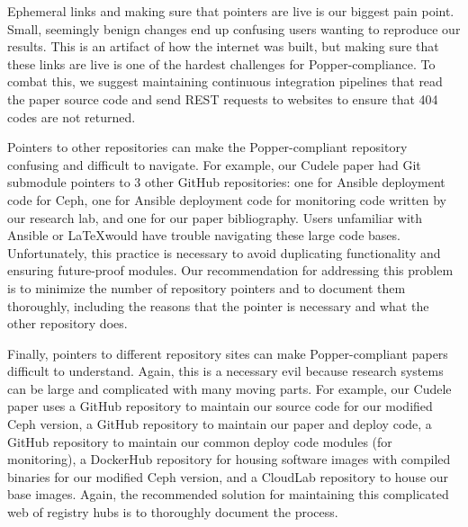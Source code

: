 Ephemeral links and making sure that pointers are live is our biggest pain
point. Small, seemingly benign changes end up confusing users wanting to
reproduce our results. This is an artifact of how the internet was built, but
making sure that these links are live is one of the hardest challenges for
Popper-compliance. To combat this, we suggest maintaining continuous
integration pipelines that read the paper source code and send REST requests to
websites to ensure that 404 codes are not returned.

Pointers to other repositories can make the Popper-compliant repository
confusing and difficult to navigate. For example, our Cudele paper had Git
submodule pointers to 3 other GitHub repositories: one for Ansible deployment
code for Ceph, one for Ansible deployment code for monitoring code written by
our research lab, and one for our paper bibliography. Users unfamiliar with
Ansible or \LaTeX would have trouble navigating these large code bases.
Unfortunately, this practice is necessary to avoid duplicating functionality
and ensuring future-proof modules. Our recommendation for addressing this
problem is to minimize the number of repository pointers and to document them
thoroughly, including the reasons that the pointer is necessary and what the
other repository does.

Finally, pointers to different repository sites can make Popper-compliant
papers difficult to understand. Again, this is a necessary evil because
research systems can be large and complicated with many moving parts. For
example, our Cudele paper uses a GitHub repository to maintain our source code
for our modified Ceph version, a GitHub repository to maintain our paper and
deploy code, a GitHub repository to maintain our common deploy code modules
(for monitoring), a DockerHub repository for housing software images with
compiled binaries for our modified Ceph version, and a CloudLab repository to
house our base images. Again, the recommended solution for maintaining this
complicated web of registry hubs is to thoroughly document the process.




